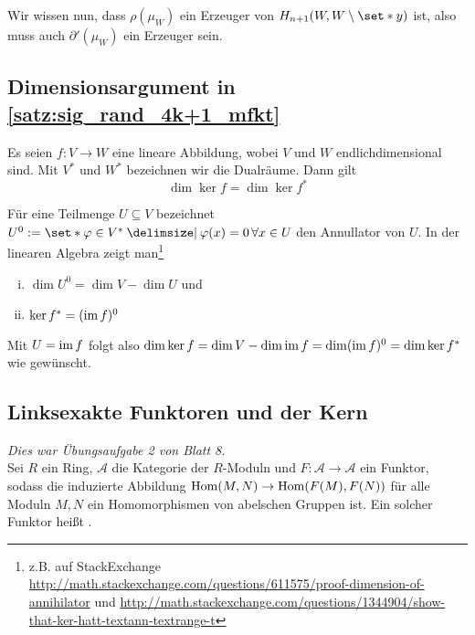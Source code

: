 \begin{beweis}[{name={\cite[\RM{14}. Th.~7.6]{Massey}}}]
	Wir wissen nun, dass $\rho(\mu_W)$ ein Erzeuger von $H_{n+1} (W,W\setminus \set*{y})$ ist, also muss auch $\partial'(\mu_W)$ ein Erzeuger sein.
\end{beweis}



\subsection{Dimensionsargument in \autoref{satz:sig_rand_4k+1_mfkt}} %
\label{sub:dimensionsargument_rand_mfkt}
Es seien $f \colon V \to W$ eine lineare Abbildung, wobei $V$ und $W$ endlichdimensional sind. 
Mit $V^*$ und $W^*$ bezeichnen wir die Dualräume.
Dann gilt
\[
	\dim \ker f = \dim \ker f^*
\]
\begin{beweis}
	Für eine Teilmenge $U \subseteq V$ bezeichnet $U^0 := \set*{\varphi \in V^* \given \varphi(x)=0 \,\forall x \in U}$ den Annullator von $U$.
	In der linearen Algebra zeigt man\footnote{z.B. auf StackExchange \url{http://math.stackexchange.com/questions/611575/proof-dimension-of-annihilator} und \url{http://math.stackexchange.com/questions/1344904/show-that-ker-hatt-textann-textrange-t}}
	\begin{enumerate}[(i)]
		\item $\dim U^0 = \dim V - \dim U$ und
		\item $\ker f^* = (\operatorname{im} f)^0$
	\end{enumerate}
	Mit $U= \operatorname{im} f$ folgt also
	\(
		\dim \ker f = \dim V - \dim \operatorname{im} f = \dim (\operatorname{im} f)^0 = \dim \ker f^* 
	\) wie gewünscht.
\end{beweis}

\subsection{Linksexakte Funktoren und der Kern} %
\label{sub:exakte_funktoren_und_der_kern}
\emph{Dies war Übungsaufgabe 2 von Blatt 8.}\smallskip \\
Sei $R$ ein Ring, $\mathcal{A}$ die Kategorie der $R$-Moduln und $F \colon \mathcal{A} \to \mathcal{A}$ ein Funktor, sodass die induzierte Abbildung $\Hom(M,N) \to \Hom \enbrace*{F(M), F(N)}$ für alle Moduln $M,N$ ein Homomorphismen von abelschen Gruppen ist. 
Ein solcher Funktor heißt .

